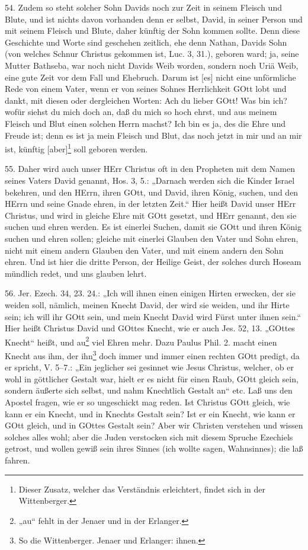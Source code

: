 54. Zudem so steht solcher Sohn Davids noch zur Zeit in seinem Fleisch und Blute, und ist nichts davon vorhanden denn er selbst, David, in seiner Person und mit seinem Fleisch und Blute, daher künftig der Sohn kommen sollte. Denn diese Geschichte und Worte sind geschehen zeitlich, ehe denn Nathan, Davids Sohn (von welches Schnur Christus gekommen ist, Luc. 3, 31.), geboren ward; ja, seine Mutter Bathseba, war noch nicht Davids Weib worden, sondern noch Uriä Weib, eine gute Zeit vor dem Fall und Ehebruch. Darum ist [es] nicht eine unförmliche Rede von einem Vater, wenn er von seines Sohnes Herrlichkeit GOtt lobt und dankt, mit diesen oder dergleichen Worten: Ach du lieber GOtt! Was bin ich? wofür siehst du mich doch an, daß du mich so hoch ehrst, und aus meinem Fleisch und Blut einen solchen Herrn machst? Ich bin es ja, des die Ehre und Freude ist; denn es ist ja mein Fleisch und Blut, das noch jetzt in mir und an mir ist, künftig [aber]\footnote{Dieser Zusatz, welcher das Verständnis erleichtert, findet sich in der Wittenberger.} soll geboren werden.

55. Daher wird auch unser HErr Christus oft in den Propheten mit dem Namen seines Vaters David genannt, Hos. 3, 5.: „Darnach werden sich die Kinder Israel bekehren, und den HErrn, ihren GOtt, und David, ihren König, suchen, und den HErrn und seine Gnade ehren, in der letzten Zeit.“ Hier heißt David unser HErr Christus, und wird in gleiche Ehre mit GOtt gesetzt, und HErr genannt, den sie suchen und ehren werden. Es ist einerlei Suchen, damit sie GOtt und ihren König suchen und ehren sollen; gleiche mit einerlei Glauben den Vater und Sohn ehren, nicht mit einem andern Glauben den Vater, und mit einem andern den Sohn ehren. Und ist hier die dritte Person, der Heilige Geist, der solches durch Hoseam mündlich redet, und uns glauben lehrt.

56. Jer. Ezech. 34, 23. 24.: „Ich will ihnen einen einigen Hirten erwecken, der sie weiden soll, nämlich, meinen Knecht David, der wird sie weiden, und ihr Hirte sein; ich will ihr GOtt sein, und mein Knecht David wird Fürst unter ihnen sein.“ Hier heißt Christus David und GOttes Knecht, wie er auch Jes. 52, 13. „GOttes Knecht“ heißt, und au\footnote{„au“ fehlt in der Jenaer und in der Erlanger.} viel Ehren mehr. Dazu Paulus Phil. 2. macht einen Knecht aus
ihm, der ihn\footnote{So die Wittenberger. Jenaer und Erlanger: ihnen.} doch immer und immer einen rechten GOtt predigt, da er spricht, V. 5–7.: „Ein jeglicher sei gesinnet wie Jesus Christus, welcher, ob er wohl in göttlicher Gestalt war, hielt er es nicht für einen Raub, GOtt gleich sein, sondern äußerte sich selbst, und nahm Knechtlich Gestalt an“ etc. Laß uns den Apostel fragen, wie er so ungeschickt mag reden. Ist Christus GOtt gleich, wie kann er ein Knecht, und in Knechts Gestalt sein? Ist er ein Knecht, wie kann er GOtt gleich, und in GOttes Gestalt sein? Aber wir Christen verstehen und wissen solches alles wohl; aber die Juden verstocken sich mit diesem Spruche Ezechiels getrost, und wollen gewiß sein ihres Sinnes (ich wollte sagen, Wahnsinnes); die laß fahren.

